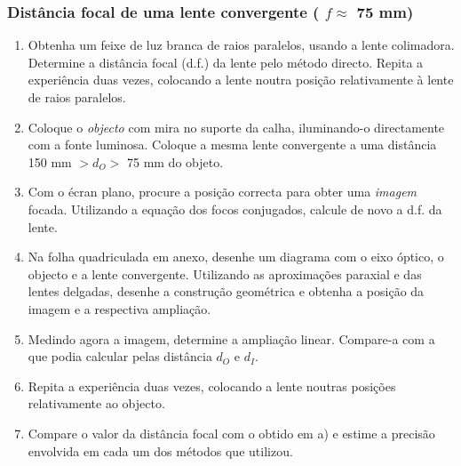 \documentclass[a4paper,12pt]{article}      %
\begin{document}
\subsubsection{\sf   Distância focal de uma lente convergente ( $f  \approx$ 75 mm) }
 
\begin{enumerate}
\item Obtenha  um  feixe  de  luz  branca  de  raios  paralelos, usando a lente colimadora.
Determine  a  distância  focal (d.f.)  da  lente pelo método directo.  Repita  a  experiência  duas  vezes,  colocando  a  lente 
noutra posição relativamente à lente de raios paralelos. 
\item Coloque o \emph{objecto} com mira no suporte da calha, iluminando-o directamente com a fonte luminosa. Coloque a mesma lente convergente a uma distância 150 mm $> d_O >$ 75 mm do objeto.

\item Com o écran plano, procure a posição correcta para obter uma \emph{imagem} focada.
Utilizando a equação dos focos conjugados, calcule de novo a d.f. da lente. 
\item Na folha quadriculada em anexo, desenhe um diagrama com o eixo óptico, o objecto e a lente convergente. Utilizando as aproximações paraxial e das lentes delgadas, desenhe a construção geométrica e obtenha a posição da imagem e a respectiva ampliação.

\item Medindo agora a imagem, determine a ampliação linear. Compare-a com a que podia  calcular pelas distância $d_O$  e $d_I$. 
\item Repita a experiência duas vezes, colocando a lente noutras posições relativamente ao objecto.  
\item Compare o valor da distância focal com o obtido em a) e estime a precisão envolvida em 
cada um dos métodos que utilizou. 
\end{enumerate}

\end{document}
